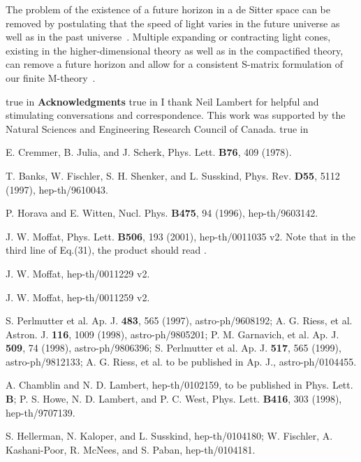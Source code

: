 \documentclass[a4paper,12pt]{article}
\begin{document}
The problem of the existence of a future horizon in a de Sitter space
can be removed by postulating that the speed of light varies in the future
universe as well as in the past universe~\cite{Moffat4}. Multiple expanding
or contracting light cones, existing in the higher-dimensional theory as
well as in the compactified theory, can remove a future horizon and allow
for a consistent S-matrix formulation of our finite
M-theory~\cite{Clayton,Drummond,Liberati}.

 true in
{\bf Acknowledgments}
 true in
I thank Neil Lambert for helpful and
stimulating conversations and correspondence. This work was supported by
the Natural Sciences and Engineering Research Council of Canada.
 true in

\begin{thebibliography}{100}

 E. Cremmer, B. Julia, and J. Scherk, Phys. Lett. {\bf
B76}, 409 (1978).

 T. Banks, W. Fischler, S. H. Shenker, and L. Susskind,
Phys. Rev. {\bf D55}, 5112 (1997), hep-th/9610043.

 P. Horava and E. Witten, Nucl. Phys. {\bf B475}, 94
(1996), hep-th/9603142.

 J. W. Moffat, Phys. Lett. {\bf B506}, 193
(2001), hep-th/0011035 v2. Note that in the third line of Eq.(31), the
product \myHighlight{$\phi(\rho)\phi(\eta)$}\coordHE{} should read \myHighlight{$[\phi(\rho),\phi(\eta)]$}\coordHE{}.

 J. W. Moffat, hep-th/0011229 v2.

 J. W. Moffat, hep-th/0011259 v2.

 S. Perlmutter et al. Ap. J. {\bf 483},
565 (1997), astro-ph/9608192; A. G. Riess, et al. Astron. J. {\bf 116},
1009 (1998), astro-ph/9805201; P. M. Garnavich, et al. Ap. J. {\bf 509}, 74
(1998), astro-ph/9806396; S. Perlmutter et al. Ap. J. {\bf 517}, 565
(1999), astro-ph/9812133; A. G. Riess, et al. to be published in Ap. J.,
astro-ph/0104455.

 A. Chamblin and N. D. Lambert, hep-th/0102159, to be
published in Phys. Lett. {\bf B}; P. S. Howe, N. D. Lambert, and P. C.
West, Phys. Lett. {\bf B416}, 303 (1998), hep-th/9707139.

 S. Hellerman, N. Kaloper, and L. Susskind,
hep-th/0104180; W. Fischler, A. Kashani-Poor, R. McNees, and S. Paban,
hep-th/0104181.


\end{thebibliography}
\end{document}
